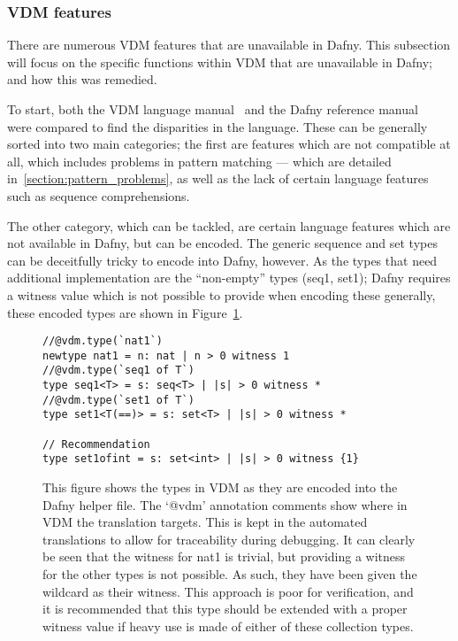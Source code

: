 \documentclass{entcs}
\newcommand{\awcomment}[1]{\ifthenelse { \boolean{showComments} } {\textcolor{blue}{AW:~#1}} { } } %
\newcommand{\lfcomment}[1]{\ifthenelse { \boolean{showComments} } {\textcolor{red}{LF:~#1}} { } } %
\begin{document}
\subsubsection{VDM features}\label{section:vdm_features}\label{section:distributed_expressions}
There are numerous VDM features that are unavailable in Dafny. This subsection will focus on the specific functions within VDM that are unavailable in Dafny; and how this was remedied. 

To start, both the VDM language manual~\cite{VDMLangMan} and the Dafny reference manual~\cite{DfyRef} were compared to find the disparities in the language. These can be generally sorted into two main categories; the first are features which are not compatible at all, which includes problems in pattern matching --- which are detailed in~\ref{section:pattern_problems}, as well as the lack of certain language features such as sequence comprehensions. 

The other category, which can be tackled, are certain language features which are not available in Dafny, but can be encoded. The generic sequence and set types can be deceitfully tricky to encode into Dafny, however. As the types that need additional implementation are the ``non-empty'' types (seq1, set1); Dafny requires a witness value which is not possible to provide when encoding these generally, these encoded types are shown in Figure~\ref{fig:vdm_types_in_dafny}.

\begin{figure}[h]
	\begin{center}
        \begin{lstlisting}
//@vdm.type(`nat1`)
newtype nat1 = n: nat | n > 0 witness 1
//@vdm.type(`seq1 of T`)
type seq1<T> = s: seq<T> | |s| > 0 witness * 
//@vdm.type(`set1 of T`)
type set1<T(==)> = s: set<T> | |s| > 0 witness * 

// Recommendation
type set1ofint = s: set<int> | |s| > 0 witness {1}
        \end{lstlisting}
		\caption{This figure shows the types in VDM as they are encoded into the Dafny helper file. The `@vdm' annotation comments show where in VDM the translation targets. This is kept in the automated translations to allow for traceability during debugging. It can clearly be seen that the witness for nat1 is trivial, but providing a witness for the other types is not possible. As such, they have been given the wildcard as their witness. This approach is poor for verification, and it is recommended that this type should be extended with a proper witness value if heavy use is made of either of these collection types.}\label{fig:vdm_types_in_dafny}
	\end{center}
\end{figure}
\end{document}

